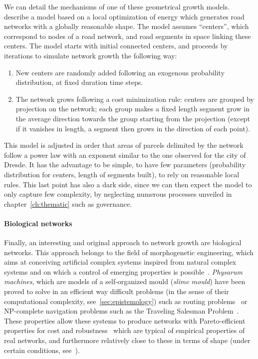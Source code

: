 \documentclass[galley]{jtlu-article-2col}
\begin{document}
We can detail the mechanisms of one of these geometrical growth models. \cite{barthelemy2008modeling} describe a model based on a local optimization of energy which generates road networks with a globally reasonable shape. The model assumes ``centers'', which correspond to nodes of a road network, and road segments in space linking these centers. The model starts with initial connected centers, and proceeds by iterations to simulate network growth the following way:
\begin{enumerate}
	\item New centers are randomly added following an exogenous probability distribution, at fixed duration time steps.
	\item The network grows following a cost minimization rule: centers are grouped by projection on the network; each group makes a fixed length segment grow in the average direction towards the group starting from the projection (except if it vanishes in length, a segment then grows in the direction of each point).
\end{enumerate}
This model is adjusted in order that areas of parcels delimited by the network follow a power law with an exponent similar to the one observed for the city of Dresde. It has the advantage to be simple, to have few parameters (probability distribution for centers, length of segments built), to rely on reasonable local rules. This last point has also a dark side, since we can then expect the model to only capture few complexity, by neglecting numerous processes unveiled in chapter~\ref{ch:thematic} such as governance.



\paragraph{Biological networks}

Finally, an interesting and original approach to network growth are biological networks. This approach belongs to the field of morphogenetic engineering, which aims at conceiving artificial complex systems inspired from natural complex systems and on which a control of emerging properties is possible~\cite{doursat2012morphogenetic}. \emph{Physarum machines}, which are models of a self-organized mould (\emph{slime mould}) have been proved to solve in an efficient way difficult problems (in the sense of their computational complexity, see~\ref{sec:epistemology}) such as routing problems~\cite{tero2006physarum} or NP-complete navigation problems such as the Traveling Salesman Problem~\cite{zhu2013amoeba}. These properties allow these systems to produce networks with Pareto-efficient properties for cost and robustness~\cite{tero2010rules} which are typical of empirical properties of real networks, and furthermore relatively close to these in terms of shape (under certain conditions, see~\cite{adamatzky2010road}).
\end{document}
